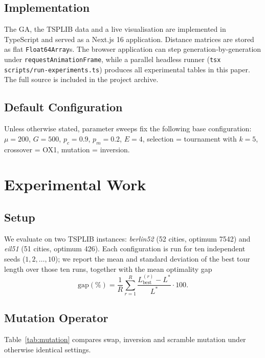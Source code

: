 \documentclass[conference]{IEEEtran}
\begin{document}
\subsection{Implementation}

The GA, the TSPLIB data and a live visualisation are implemented in
TypeScript and served as a Next.js 16 application. Distance matrices are
stored as flat \texttt{Float64Array}s. The browser application can step
generation-by-generation under \texttt{requestAnimationFrame}, while a
parallel headless runner (\texttt{tsx scripts/run-experiments.ts}) produces
all experimental tables in this paper. The full source is included in the
project archive.

\subsection{Default Configuration}

Unless otherwise stated, parameter sweeps fix the following base
configuration: $\mu = 200$, $G = 500$, $p_c = 0.9$, $p_m = 0.2$, $E = 4$,
selection = tournament with $k=5$, crossover = OX1, mutation = inversion.

\section{Experimental Work}\label{sec:experiments}

\subsection{Setup}

We evaluate on two TSPLIB instances:
\textit{berlin52} (52 cities, optimum 7542) and \textit{eil51} (51 cities,
optimum 426). Each configuration is run for ten independent seeds
($1, 2, \dots, 10$); we report the mean and standard deviation of the best
tour length over those ten runs, together with the mean optimality gap
\[
\text{gap}(\%) = \frac{1}{R} \sum_{r=1}^{R}
   \frac{L^{(r)}_{\text{best}} - L^{*}}{L^{*}} \cdot 100.
\]

\subsection{Mutation Operator}\label{sec:mut-op}

Table~\ref{tab:mutation} compares swap, inversion and scramble mutation
under otherwise identical settings.
\end{document}

